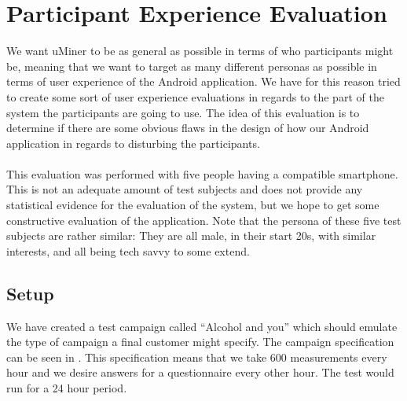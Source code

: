 \section{Participant Experience Evaluation}
\label{sec:participant_experience_evaluation}

We want uMiner to be as general as possible in terms of who participants might be, meaning that we want to target as many different personas as possible in terms of user experience of the Android application. We have for this reason tried to create some sort of user experience evaluations in regards to the part of the system the participants are going to use. The idea of this evaluation is to determine if there are some obvious flaws in the design of how our Android application in regards to disturbing the participants. 
\\\\
This evaluation was performed with five people having a compatible smartphone. This is not an adequate amount of test subjects and does not provide any statistical evidence for the evaluation of the system, but we hope to get some constructive evaluation of the application. Note that the persona of these five test subjects are rather similar: They are all male, in their start 20s, with similar interests, and all being tech savvy to some extend.

\subsection{Setup}
\label{sub:setup}

We have created a test campaign called ``Alcohol and you'' which should emulate the type of campaign a final customer might specify. The campaign specification can be seen in . This specification means that we take 600 measurements every hour and we desire answers for a questionnaire every other hour. The test would run for a 24 hour period. 

